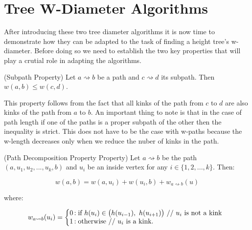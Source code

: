 
\section{Tree W-Diameter Algorithms}


After introducing these two tree diameter algorithms it is now time to demonstrate how they can be adapted to the task of finding a height tree's w-diameter. Before doing so we need to establish the two key properties that will play a crutial role in adapting the algorithms.


\begin{defn} (Subpath Property) Let $a \rightsquigarrow b$ be a path and $c \rightsquigarrow d$ its subpath. Then $w(a, b) \le w(c, d)$. \end{defn}

This property follows from the fact that all kinks of the path from $c$ to $d$ are also kinks of the path from $a$ to $b$. An important thing to note is that in the case of path length if one of the paths is a proper subpath of the other then the inequality is strict. This does not have to be the case with w-paths because the w-length decreases only when we reduce the nuber of kinks in the path.

\begin{defn} (Path Decomposition Property Property) Let $a \rightsquigarrow b$ be the path $(a, u_1, u_2, ..., u_k, b)$ and $u_i$ be an inside vertex for any $i \in \{1, 2, ..., k\}$. Then: \end{defn}

    $$w(a, b) = w(a, u_i) + w(u_i, b) + w_{a \rightsquigarrow b}(u)$$

   where:

   $$
   w_{a \rightsquigarrow b}(u_i) = \left\{
       \begin{array}{@{}l@{\thinspace}l}
           \text{0}  &: \text{if } h(u_i) \in \big(h(u_{i-1}),~h(u_{i+1}) \big) \text{ // $u_i$ is not a kink} \\
           \text{1} &: \text{otherwise // $u_i$ is a kink.} \\
       \end{array}
   \right.
   $$


